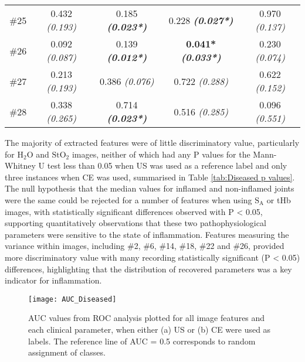 \documentclass[twoside]{bhamthesis}
\theoremstyle{definition}
\begin{document}
\begin{table}[!ht]
\begin{center}
\begin{tabular}{|c| c c c c|}
\rule[-1ex]{0pt}{3.5ex}  \#25  & 0.432 \textit{(0.193)} & 0.185 \textbf{\textit{(0.023*)}} & 0.228 \textbf{\textit{(0.027*)}} & 0.970 \textit{(0.137)}\\
\rule[-1ex]{0pt}{3.5ex}  \#26  & 0.092 \textit{(0.087)} & 0.139 \textbf{\textit{(0.012*)}}  & \textbf{0.041*}\textbf{ \textit{(0.033*)} } & 0.230 \textit{(0.074)} \\ 
\rule[-1ex]{0pt}{3.5ex}  \#27  & 0.213 \textit{(0.193)} & 0.386 \textit{(0.076)} & 0.722 \textit{(0.288)} & 0.622 \textit{(0.152)} \\
\rule[-1ex]{0pt}{3.5ex}  \#28 & 0.338 \textit{(0.265)} & 0.714 \textbf{\textit{(0.023*)}}  & 0.516 \textit{(0.285)} & 0.096 \textit{(0.551)} \\

\hline
\end{tabular}
\end{center}
\end{table} 

The majority of extracted features were of little discriminatory value, particularly for $\mathrm{H_2O}$ and $\mathrm{StO_2}$ images, neither of which had any P values for the Mann-Whitney U test less than 0.05 when US was used as a reference label and only three instances when CE was used, summarised in Table \ref{tab:Diseased p values}. The null hypothesis that the median values for inflamed and non-inflamed joints were the same could be rejected for a number of features when using $\mathrm{S_A}$ or tHb images, with statistically significant differences observed with P < 0.05, supporting quantitatively observations that these two pathophysiological parameters were sensitive to the state of inflammation. Features measuring the variance within images, including  \#2, \#6, \#14, \#18, \#22 and \#26, provided more discriminatory value with  many recording statistically significant (P < 0.05) differences, highlighting that the distribution of recovered parameters was a key indicator for inflammation.
 
\begin{figure}[!ht]
\centering\texttt{[image: AUC\_Diseased]}\caption{AUC values from ROC analysis plotted for all image features and each clinical parameter, when either (a) US or (b) CE were used as labels. The reference line of AUC = 0.5 corresponds to random assignment of classes.}
\label{fig:AUC_Diseased}
\end{figure}
\end{document}
